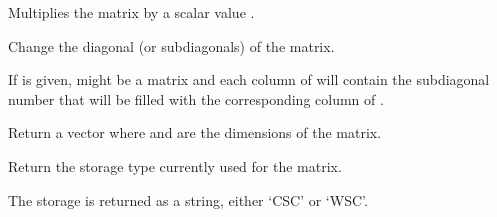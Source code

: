 \documentclass[a4paper,11pt,english]{sphinxmanual}
\begin{document}
\begin{fulllineitems}
\begin{fulllineitems}
\end{fulllineitems}


\begin{fulllineitems}
\label{\detokenize{python/cmdref_Spmat:getfem.Spmat.scale}}
Multiplies the matrix by a scalar value .

\end{fulllineitems}


\begin{fulllineitems}
\label{\detokenize{python/cmdref_Spmat:getfem.Spmat.set_diag}}
Change the diagonal (or sub\sphinxhyphen{}diagonals) of the matrix.

If  is given,  might be a matrix and each column of  will
contain the sub\sphinxhyphen{}diagonal number that will be filled with the
corresponding column of .

\end{fulllineitems}


\begin{fulllineitems}
\label{\detokenize{python/cmdref_Spmat:getfem.Spmat.size}}
Return a vector where  and  are the dimensions of the matrix.

\end{fulllineitems}


\begin{fulllineitems}
\label{\detokenize{python/cmdref_Spmat:getfem.Spmat.storage}}
Return the storage type currently used for the matrix.

The storage is returned as a string, either ‘CSC’ or ‘WSC’.


\end{fulllineitems}
\end{fulllineitems}
\end{document}
